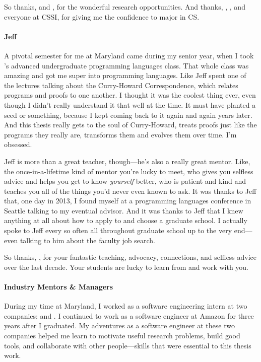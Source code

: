So thanks,  and , for the wonderful research opportunities.
And thanks, , , and everyone at  CSSI, for giving me the confidence to major in CS.

\paragraph{Jeff}
A pivotal semester for me at Maryland came during my senior year, when I took 's advanced undergraduate programming languages class.
That whole class was amazing and got me super into programming languages.
Like Jeff spent one of the lectures talking about the Curry-Howard Correspondence,
which relates programs and proofs to one another.
I thought it was the coolest thing ever, even though I didn't really understand it that well at the time.
It must have planted a seed or something, because I kept coming back to it again and again years later.
And this thesis really gets to the soul of Curry-Howard, treats proofs just like the programs they really are,
transforms them and evolves them over time.
I'm obsessed.

Jeff is more than a great teacher, though---he's also a really great mentor.
Like, the once-in-a-lifetime kind of mentor you're lucky to meet, who gives you selfless advice and helps you get to know \textit{yourself} better,
who is patient and kind and teaches you all of the things you'd never even known to ask.
It was thanks to Jeff that, one day in 2013, I found myself at a programming languages conference in Seattle talking to my eventual advisor.
And it was thanks to Jeff that I knew anything at all about how to apply to and choose a graduate school.
I actually spoke to Jeff every so often all throughout graduate school up to the very 
end---even talking to him about the faculty job search.

So thanks, , for your fantastic teaching, advocacy, connections, and selfless advice over the last decade.
Your students are lucky to learn from and work with you.

\paragraph{Industry Mentors \& Managers}
During my time at Maryland, I worked as a software engineering intern at two companies:
 and .
I continued to work as a software engineer at Amazon for three years after I graduated.
My adventures as a software engineer at these two companies helped me learn to motivate useful research problems,
build good tools, and collaborate with other people---skills that were essential to this thesis work.

